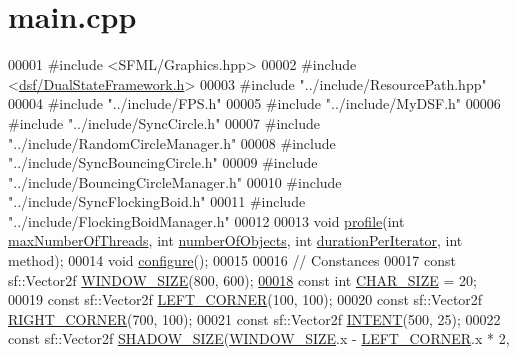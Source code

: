 \hypertarget{main_8cpp_source}{}\section{main.\+cpp}
\label{main_8cpp_source}

\begin{DoxyCode}
00001 \textcolor{preprocessor}{#include <SFML/Graphics.hpp>}
00002 \textcolor{preprocessor}{#include <\hyperlink{_dual_state_framework_8h}{dsf/DualStateFramework.h}>}
00003 \textcolor{preprocessor}{#include "../include/ResourcePath.hpp"}
00004 \textcolor{preprocessor}{#include "../include/FPS.h"}
00005 \textcolor{preprocessor}{#include "../include/MyDSF.h"}
00006 \textcolor{preprocessor}{#include "../include/SyncCircle.h"}
00007 \textcolor{preprocessor}{#include "../include/RandomCircleManager.h"}
00008 \textcolor{preprocessor}{#include "../include/SyncBouncingCircle.h"}
00009 \textcolor{preprocessor}{#include "../include/BouncingCircleManager.h"}
00010 \textcolor{preprocessor}{#include "../include/SyncFlockingBoid.h"}
00011 \textcolor{preprocessor}{#include "../include/FlockingBoidManager.h"}
00012 
00013 \textcolor{keywordtype}{void} \hyperlink{main_8cpp_a31968186041d4f1e3533777bcb15719c}{profile}(\textcolor{keywordtype}{int} \hyperlink{main_8cpp_a4639134a7fa7033334111ff9d77316f3}{maxNumberOfThreads}, \textcolor{keywordtype}{int} 
      \hyperlink{main_8cpp_a2303e0afaea24a80ed690de888548862}{numberOfObjects}, \textcolor{keywordtype}{int} \hyperlink{main_8cpp_a05d9b1ebdb968e99b310a90811f1be91}{durationPerIterator}, \textcolor{keywordtype}{int} method);
00014 \textcolor{keywordtype}{void} \hyperlink{main_8cpp_ae369b3765489ee8bd0ea791c1843630f}{configure}();
00015 
00016 \textcolor{comment}{// Constances}
00017 \textcolor{keyword}{const} sf::Vector2f \hyperlink{main_8cpp_a16e701dc89b4e8467da382318f0d48df}{WINDOW\_SIZE}(800, 600);
\hypertarget{main_8cpp_source_l00018}{}\hyperlink{main_8cpp_ad48cdf9a3927c8fa8f6017c70d046ba0}{00018} \textcolor{keyword}{const} \textcolor{keywordtype}{int} \hyperlink{main_8cpp_ad48cdf9a3927c8fa8f6017c70d046ba0}{CHAR\_SIZE} = 20;
00019 \textcolor{keyword}{const} sf::Vector2f \hyperlink{main_8cpp_a532235d92b81b25e98dc2f260296c811}{LEFT\_CORNER}(100, 100);
00020 \textcolor{keyword}{const} sf::Vector2f \hyperlink{main_8cpp_a80493c8c36da06f9e6846f4b1bec3e51}{RIGHT\_CORNER}(700, 100);
00021 \textcolor{keyword}{const} sf::Vector2f \hyperlink{main_8cpp_a14d85091e46f0926119718516c204b46}{INTENT}(500, 25);
00022 \textcolor{keyword}{const} sf::Vector2f \hyperlink{main_8cpp_ae7a422ac0192aae5609b1fd4202be5eb}{SHADOW\_SIZE}(\hyperlink{main_8cpp_a16e701dc89b4e8467da382318f0d48df}{WINDOW\_SIZE}.x - \hyperlink{main_8cpp_a532235d92b81b25e98dc2f260296c811}{LEFT\_CORNER}.x * 2, 

\end{DoxyCode}
